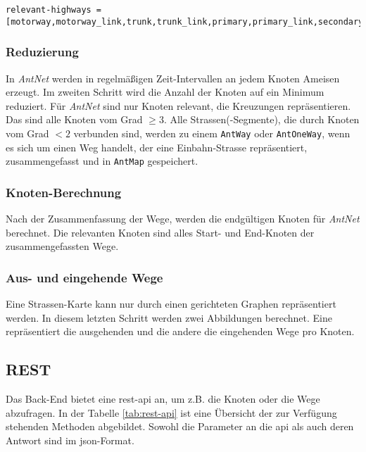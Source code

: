 \begin{lstlisting}
relevant-highways = [motorway,motorway_link,trunk,trunk_link,primary,primary_link,secondary,tertiary]
\end{lstlisting}

\subsubsection{Reduzierung}
\label{sec:reduzierung}

In \textit{AntNet} werden in regelmäßigen Zeit-Intervallen an jedem Knoten Ameisen erzeugt.
Im zweiten Schritt wird die Anzahl der Knoten auf ein Minimum reduziert.
Für \textit{AntNet} sind nur Knoten relevant, die Kreuzungen repräsentieren.
Das sind alle Knoten vom Grad $\geq 3$.
Alle Strassen(-Segmente), die durch Knoten vom Grad $< 2$ verbunden sind, werden zu einem \texttt{AntWay} oder \texttt{AntOneWay}, wenn es sich um einen Weg handelt, der eine Einbahn-Strasse repräsentiert, zusammengefasst und in \texttt{AntMap} gespeichert.

\subsubsection{Knoten-Berechnung}
\label{sec:knoten-berechnung}

Nach der Zusammenfassung der Wege, werden die endgültigen Knoten für \textit{AntNet} berechnet.
Die relevanten Knoten sind alles Start- und End-Knoten der zusammengefassten Wege.

\subsubsection{Aus- und eingehende Wege}
\label{sec:aus-und-eingehende-wege}

Eine Strassen-Karte kann nur durch einen gerichteten Graphen repräsentiert werden.
In diesem letzten Schritt werden zwei Abbildungen berechnet.
Eine repräsentiert die ausgehenden und die andere die eingehenden Wege pro Knoten.

\subsection{REST}
\label{sec:rest}

Das Back-End bietet eine \gls{rest}-\gls{api} an, um z.B. die Knoten oder die Wege abzufragen.
In der Tabelle \ref{tab:rest-api} ist eine Übersicht der zur Verfügung stehenden Methoden abgebildet.
Sowohl die Parameter an die \gls{api} als auch deren Antwort sind im \gls{json}-Format.

